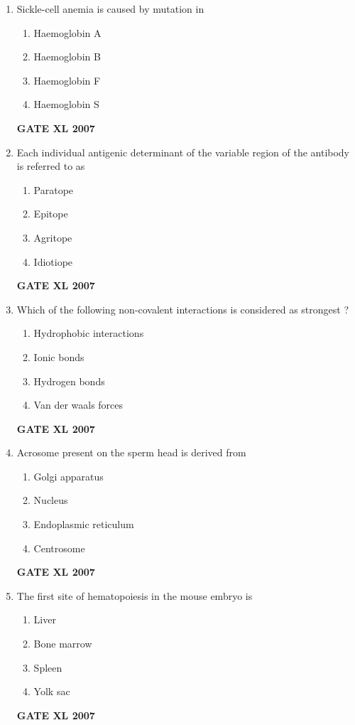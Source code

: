 \documentclass[journal,12pt,onecolumn]{IEEEtran}
\begin{document}
\begin{enumerate}
\item Sickle-cell anemia is caused by mutation in
\begin{enumerate}
    \item Haemoglobin A
    \item Haemoglobin B
    \item Haemoglobin F
    \item Haemoglobin S
\end{enumerate}\hfill{\textbf{GATE XL 2007}}

\item Each individual antigenic determinant of the variable region of the antibody is referred to as
\begin{enumerate}
    \item Paratope
    \item Epitope
    \item Agritope
    \item Idiotiope
\end{enumerate}\hfill{\textbf{GATE XL 2007}}

\item Which of the following non-covalent interactions is considered as strongest ?
\begin{enumerate}
    \item Hydrophobic interactions
    \item Ionic bonds
    \item Hydrogen bonds
    \item Van der waals forces
\end{enumerate}\hfill{\textbf{GATE XL 2007}}

\item Acrosome present on the sperm head is derived from
\begin{enumerate}
    \item Golgi apparatus
    \item Nucleus
    \item Endoplasmic reticulum
    \item Centrosome
\end{enumerate}\hfill{\textbf{GATE XL 2007}}

\item The first site of hematopoiesis in the mouse embryo is
\begin{enumerate}
    \item Liver
    \item Bone marrow
    \item Spleen
    \item Yolk sac
\end{enumerate}\hfill{\textbf{GATE XL 2007}}


\end{enumerate}
\end{document}
